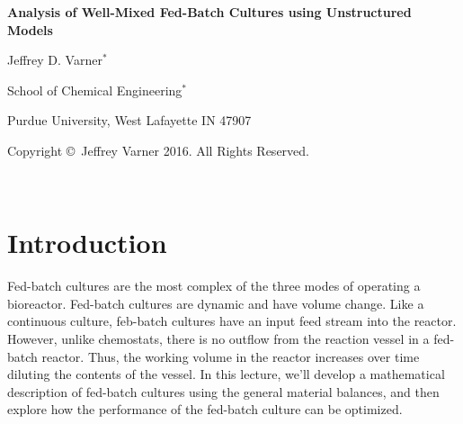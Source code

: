 \documentclass[11pt]{article}
\theoremstyle{definition}
\begin{document}
{\par\centering\textbf{\Large Analysis of Well-Mixed Fed-Batch Cultures using Unstructured Models}}
\vspace{0.2in}
{\par \centering \large{Jeffrey D. Varner$^{*}$}}
\vspace{0.05in}
{\par \centering \large{School of Chemical Engineering$^{*}$}}
{\par \centering \large{Purdue University, West Lafayette IN 47907}}
\vspace{0.1in}
{\par \centering \small{Copyright \copyright\ Jeffrey Varner 2016. All Rights Reserved.}}\\

\date{}
\thispagestyle{empty}

\setcounter{page}{1}


\section*{Introduction}
Fed-batch cultures are the most complex of the three modes of operating a bioreactor. Fed-batch cultures are dynamic and have volume change.
Like a continuous culture, feb-batch cultures have an input feed stream into the reactor.
However, unlike chemostats, there is no outflow from the reaction vessel in a fed-batch reactor.
Thus, the working volume in the reactor increases over time diluting the contents of the vessel.
In this lecture, we'll develop a mathematical description of
fed-batch cultures using the general material balances, and then explore how the performance of the fed-batch culture can be optimized.
\end{document}
